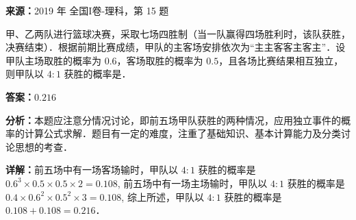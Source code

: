 \begin{question}[points=5]
\textbf{来源：}2019 年 全国I卷-理科，第 15 题\par
甲、乙两队进行篮球决赛，采取七场四胜制（当一队赢得四场胜利时，该队获胜，决赛结束）．根据前期比赛成绩，甲队的主客场安排依次为“主主客客主客主”．设甲队主场取胜的概率为 $0.6$，客场取胜的概率为 $0.5$，且各场比赛结果相互独立，则甲队以 $4 \colon 1$ 获胜的概率是．
\fillin[{$0.216$}]
\begin{solution}
\textbf{答案：}$0.216$

\textbf{分析：}本题应注意分情况讨论，即前五场甲队获胜的两种情况，应用独立事件的概率的计算公式求解．题目有一定的难度，注重了基础知识、基本计算能力及分类讨论思想的考查．

\textbf{详解：}前五场中有一场客场输时，甲队以 $4 \colon 1$ 获胜的概率是 $0.6^3 \times 0.5 \times 0.5 \times 2 = 0.108$, 前五场中有一场主场输时，甲队以 $4 \colon 1$ 获胜的概率是 $0.4 \times 0.6^2 \times 0.5^2 \times 3 = 0.108$, 综上所述，甲队以 $4 \colon 1$ 获胜的概率是 $0.108 + 0.108 = 0.216$．
\end{solution}
\end{question}


